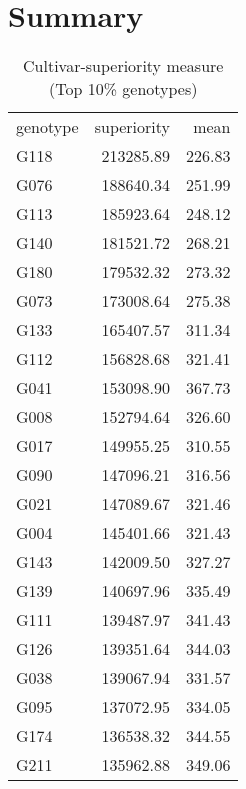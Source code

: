 \documentclass[a4paper,11pt]{article}\usepackage[]{graphicx}\usepackage[]{color}
\begin{document}
\section{Summary}
\begin{table}[ht]
\begin{flushleft}
\caption{Cultivar-superiority measure (Top 10\% genotypes)} 
\label{cultSup}
\begin{tabular}{lrr}
 genotype & superiority & mean \\ 
 G118 & 213285.89 & 226.83 \\ 
  G076 & 188640.34 & 251.99 \\ 
  G113 & 185923.64 & 248.12 \\ 
  G140 & 181521.72 & 268.21 \\ 
  G180 & 179532.32 & 273.32 \\ 
  G073 & 173008.64 & 275.38 \\ 
  G133 & 165407.57 & 311.34 \\ 
  G112 & 156828.68 & 321.41 \\ 
  G041 & 153098.90 & 367.73 \\ 
  G008 & 152794.64 & 326.60 \\ 
  G017 & 149955.25 & 310.55 \\ 
  G090 & 147096.21 & 316.56 \\ 
  G021 & 147089.67 & 321.46 \\ 
  G004 & 145401.66 & 321.43 \\ 
  G143 & 142009.50 & 327.27 \\ 
  G139 & 140697.96 & 335.49 \\ 
  G111 & 139487.97 & 341.43 \\ 
  G126 & 139351.64 & 344.03 \\ 
  G038 & 139067.94 & 331.57 \\ 
  G095 & 137072.95 & 334.05 \\ 
  G174 & 136538.32 & 344.55 \\ 
  G211 & 135962.88 & 349.06 \\ 
  \end{tabular}
\end{flushleft}
\end{table}
\end{document}
